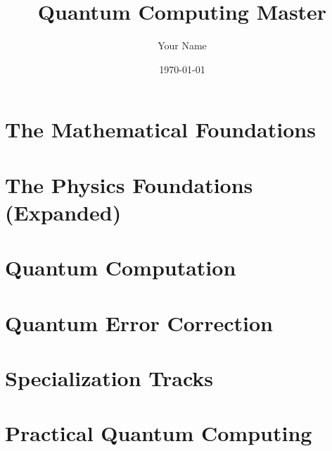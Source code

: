 \documentclass[11pt]{book}
\title{Quantum Computing Master}
\author{Your Name}
\date{\today}
\begin{document}
\frontmatter

\maketitle

\tableofcontents
\listoffigures
\listoftables

\mainmatter

\part{The Mathematical Foundations}




\part{The Physics Foundations (Expanded)}

\cleardoublepage








\part{Quantum Computation}





\part{Quantum Error Correction}






\part{Specialization Tracks}






\part{Practical Quantum Computing}




\backmatter

\printbibliography
\end{document}
